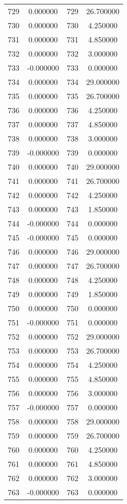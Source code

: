 \documentclass[12pt]{article}
\begin{document}
\begin{longtable}{@{}cccc@{}}
729 & 0.000000 & 729 & 26.700000 \\
730 & 0.000000 & 730 & 4.250000 \\
731 & 0.000000 & 731 & 4.850000 \\
732 & 0.000000 & 732 & 3.000000 \\
733 & -0.000000 & 733 & 0.000000 \\
734 & 0.000000 & 734 & 29.000000 \\
735 & 0.000000 & 735 & 26.700000 \\
736 & 0.000000 & 736 & 4.250000 \\
737 & 0.000000 & 737 & 4.850000 \\
738 & 0.000000 & 738 & 3.000000 \\
739 & -0.000000 & 739 & 0.000000 \\
740 & 0.000000 & 740 & 29.000000 \\
741 & 0.000000 & 741 & 26.700000 \\
742 & 0.000000 & 742 & 4.250000 \\
743 & 0.000000 & 743 & 1.850000 \\
744 & -0.000000 & 744 & 0.000000 \\
745 & -0.000000 & 745 & 0.000000 \\
746 & 0.000000 & 746 & 29.000000 \\
747 & 0.000000 & 747 & 26.700000 \\
748 & 0.000000 & 748 & 4.250000 \\
749 & 0.000000 & 749 & 1.850000 \\
750 & 0.000000 & 750 & 0.000000 \\
751 & -0.000000 & 751 & 0.000000 \\
752 & 0.000000 & 752 & 29.000000 \\
753 & 0.000000 & 753 & 26.700000 \\
754 & 0.000000 & 754 & 4.250000 \\
755 & 0.000000 & 755 & 4.850000 \\
756 & 0.000000 & 756 & 3.000000 \\
757 & -0.000000 & 757 & 0.000000 \\
758 & 0.000000 & 758 & 29.000000 \\
759 & 0.000000 & 759 & 26.700000 \\
760 & 0.000000 & 760 & 4.250000 \\
761 & 0.000000 & 761 & 4.850000 \\
762 & 0.000000 & 762 & 3.000000 \\
763 & -0.000000 & 763 & 0.000000 \\

\end{longtable}
\end{document}
